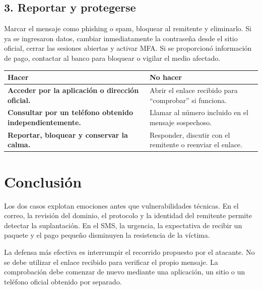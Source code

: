 \documentclass[11pt,a4paper]{article}
\begin{document}
\subsection*{3. Reportar y protegerse}

Marcar el mensaje como phishing o spam, bloquear al remitente y eliminarlo. Si ya se ingresaron datos, cambiar inmediatamente la contraseña desde el sitio oficial, cerrar las sesiones abiertas y activar MFA. Si se proporcionó información de pago, contactar al banco para bloquear o vigilar el medio afectado.

\vspace{6pt}
\begin{tabularx}{\textwidth}{>{\raggedright\arraybackslash}p{4.5cm} >{\raggedright\arraybackslash}X}
  \toprule
  \textcolor{seguro}{\textbf{Hacer}} & \textcolor{alerta}{\textbf{No hacer}} \\
  \midrule
  \textcolor{seguro}{\textbf{Acceder por la aplicación o dirección oficial.}} & Abrir el enlace recibido para ``comprobar'' si funciona. \\
  \textcolor{seguro}{\textbf{Consultar por un teléfono obtenido independientemente.}} & Llamar al número incluido en el mensaje sospechoso. \\
  \textcolor{seguro}{\textbf{Reportar, bloquear y conservar la calma.}} & Responder, discutir con el remitente o reenviar el enlace. \\
\end{tabularx}

\section*{Conclusión}

Los dos casos explotan emociones antes que vulnerabilidades técnicas. En el correo, la revisión del dominio, el protocolo y la identidad del remitente permite detectar la suplantación. En el SMS, la urgencia, la expectativa de recibir un paquete y el pago pequeño disminuyen la resistencia de la víctima.

La defensa más efectiva es interrumpir el recorrido propuesto por el atacante. No se debe utilizar el enlace recibido para verificar el propio mensaje. La comprobación debe comenzar de nuevo mediante una aplicación, un sitio o un teléfono oficial obtenido por separado.
\end{document}
